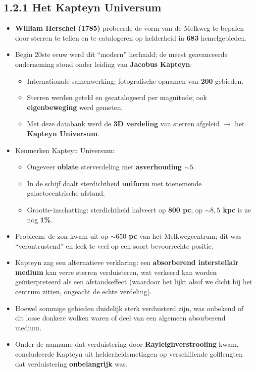 \documentclass[10pt,a4paper]{article}
\begin{document}
\subsection*{1.2.1 Het Kapteyn Universum}
\begin{itemize}
  \item \textbf{William Herschel (1785)} probeerde de vorm van de Melkweg te bepalen door sterren te tellen en te catalogeren op helderheid in \textbf{683} hemelgebieden.
  \item Begin 20ste eeuw werd dit ``modern'' herhaald; de meest geavanceerde onderneming stond onder leiding van \textbf{Jacobus Kapteyn}:
  \begin{itemize}
    \item Internationale samenwerking; fotografische opnamen van \textbf{200} gebieden.
    \item Sterren werden geteld en gecatalogeerd per magnitude; ook \textbf{eigenbeweging} werd gemeten.
    \item Met deze databank werd de \textbf{3D verdeling} van sterren afgeleid $\rightarrow$ het \textbf{Kapteyn Universum}.
  \end{itemize}
  \item Kenmerken Kapteyn Universum:
  \begin{itemize}
    \item Ongeveer \textbf{oblate} sterverdeling met \textbf{asverhouding $\sim 5$}.
    \item In de schijf daalt sterdichtheid \textbf{uniform} met toenemende galactocentrische afstand.
    \item Grootte-inschatting: sterdichtheid halveert op \textbf{800 pc}; op \textbf{$\sim 8{,}5$ kpc} is ze nog \textbf{1\%}.
  \end{itemize}
  \item Probleem: de zon kwam uit op \textbf{$\sim 650$ pc} van het Melkwegcentrum; dit was ``verontrustend'' en leek te veel op een soort bevoorrechte positie.
  \item Kapteyn zag een alternatieve verklaring: een \textbf{absorberend interstellair medium} kan verre sterren verduisteren, wat verkeerd kan worden geïnterpreteerd als een afstandseffect (waardoor het lijkt alsof we dicht bij het centrum zitten, ongeacht de echte verdeling).
  \item Hoewel sommige gebieden duidelijk sterk verduisterd zijn, was onbekend of dit losse donkere wolken waren of deel van een algemeen absorberend medium.
  \item Onder de aanname dat verduistering door \textbf{Rayleighverstrooiing} kwam, concludeerde Kapteyn uit helderheidsmetingen op verschillende golflengten dat verduistering \textbf{onbelangrijk} was.
\end{itemize}
\end{document}
